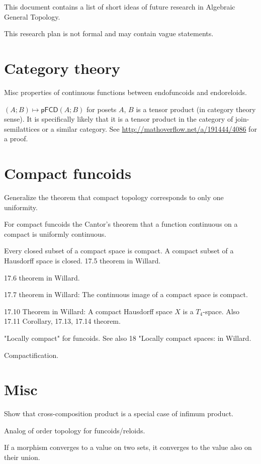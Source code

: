 \documentclass{amsart}
\begin{document}
This document contains a list of short ideas of future research in Algebraic
General Topology.

This research plan is not formal and may contain vague statements.

\section{Category theory}

Misc properties of continuous functions between endofuncoids and endoreloids.

$(A;B)\mapsto\mathsf{pFCD}(A;B)$ for posets $A$, $B$ is a tensor product
(in category theory sense). It is specifically likely that it is a tensor
product in the category of join-semilattices or a similar category.
See \url{http://mathoverflow.net/a/191444/4086} for a proof.

\section{Compact funcoids}

Generalize the theorem that compact topology corresponds to only one uniformity.

For compact funcoids the Cantor's theorem that a function continuous on a compact is uniformly continuous.

Every closed subset of a compact space is compact. A compact subset of a Hausdorff space is closed. 17.5 theorem in Willard.

17.6 theorem in Willard.

17.7 theorem in Willard: The continuous image of a compact space is compact.

17.10 Theorem in Willard: A compact Hausdorff space $X$ is a $T_4$-space. Also 17.11 Corollary, 17.13, 17.14 theorem.

"Locally compact" for funcoids. See also 18 "Locally compact spaces: in Willard.

Compactification.

\section{Misc}

Show that cross-composition product is a special case of infimum product.

Analog of order topology for funcoids/reloids.

If a morphism converges to a value on two sets, it converges to the value also on their union.
\end{document}
